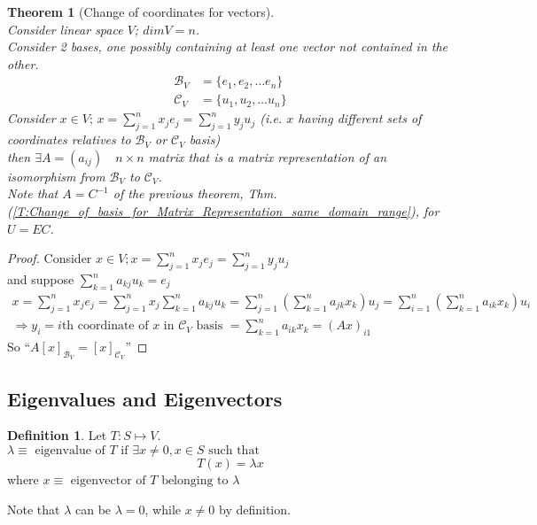 \documentclass[twoside]{amsart}
\theoremstyle{plain}
\newtheorem{theorem}{Theorem}
\theoremstyle{definition}
\newtheorem{definition}{Definition}
\begin{document}
\begin{theorem}[Change of coordinates for vectors]\quad \\
Consider linear space $V$; $dim V = n$.  \\
Consider 2 bases, one possibly containing at least one vector not contained in the other.  \\
\begin{align*}
\mathcal{B}_V &= \{ e_1, e_2, \dots e_n  \} \\
\mathcal{C}_V &= \{ u_1, u_2, \dots u_n \} 
\end{align*}
Consider $x\in V; \, x = \sum_{j=1}^n x_j e_j = \sum_{j=1}^n y_j u_j$ (i.e. $x$ having different sets of coordinates relatives to $\mathcal{B}_V$ or $\mathcal{C}_V$ basis)\\
\phantom{Consi}then $\exists A=(a_{ij}) \quad n \times n $ matrix that is a matrix representation of an isomorphism from $\mathcal{B}_V$ to $\mathcal{C}_V$.  \\
Note that $A=C^{-1}$ of the previous theorem, Thm. (\ref{T:Change_of_basis_for_Matrix_Representation_same_domain_range}), for $U=EC$.  
\end{theorem}

\begin{proof}
Consider $x\in V; x=\sum_{j=1}^n x_j e_j = \sum_{j=1}^n y_j u_j$ \\
and suppose $\sum_{k=1}^n a_{kj} u_k =e_j$ \\
\begin{gather*}
x= \sum_{j=1}^n x_j e_j = \sum_{j=1}^n x_j \sum_{k=1}^n a_{kj} u_k = \sum_{j=1}^n \left( \sum_{k=1}^n a_{jk} x_k \right) u_j = \sum_{i=1}^n \left( \sum_{k=1}^n a_{ik} x_k \right) u_i \\
\Longrightarrow y_i = i\text{th coordinate of $x$ in $\mathcal{C}_V$ basis } = \sum_{k=1}^n a_{ik}x_k = (Ax)_{i1}
\end{gather*} 
So ``$A [x]_{\mathcal{B}_V} = [x]_{\mathcal{C}_V}$''
\end{proof}

\subsection{Eigenvalues and Eigenvectors}

\begin{definition}
Let $T:S \mapsto V$.   \bigskip \\
$\lambda \equiv \text{ eigenvalue of } T \text{ if } \exists x \neq 0, x \in S \text{ such that }$
\begin{equation*}
T(x) = \lambda x
\end{equation*}
where $x \equiv \text{ eigenvector of $T$ belonging to $\lambda $ }$

Note that $\lambda$ can be $\lambda = 0$, while $x \neq 0$ by definition.  
\end{definition}
\end{document}
